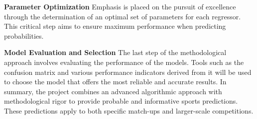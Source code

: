 \textbf{Parameter Optimization}
Emphasis is placed on the pursuit of excellence through the determination of an optimal set of parameters for each regressor. This critical step aims to ensure maximum performance when predicting probabilities.

\textbf{Model Evaluation and Selection}
The last step of the methodological approach involves evaluating the performance of the models. Tools such as the confusion matrix and various performance indicators derived from it will be used to choose the model that offers the most reliable and accurate results. In summary, the project combines an advanced algorithmic approach with methodological rigor to provide probable and informative sports predictions. These predictions apply to both specific match-ups and larger-scale competitions.
